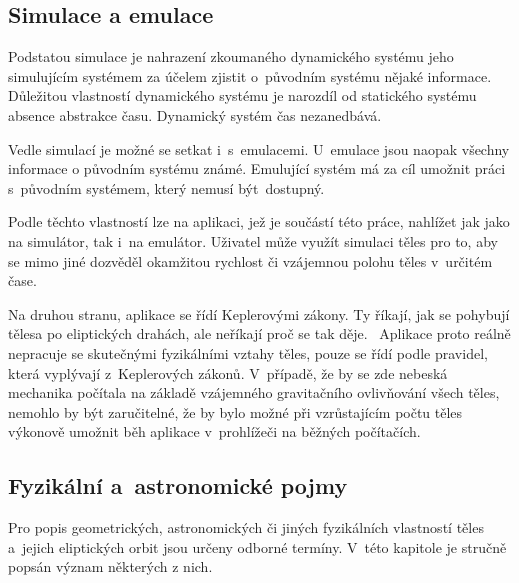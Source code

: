 \documentclass[a4paper,12pt]{article}
\begin{document}
\subsection{Simulace a emulace}

Podstatou simulace je nahrazení zkoumaného dynamického systému jeho simulujícím systémem za účelem zjistit o~původním systému nějaké informace. Důležitou vlastností dynamického systému je narozdíl od statického systému absence abstrakce času. Dynamický systém čas nezanedbává.~\cite{simulations} 

Vedle simulací je možné se setkat i~s~emulacemi. U~emulace jsou naopak všechny informace o původním systému známé. Emulující systém má za cíl umožnit práci s~původním systémem, který nemusí být~dostupný.~\cite{emulations}

Podle těchto vlastností lze na aplikaci, jež je součástí této práce, nahlížet jak jako na simulátor, tak i~na emulátor. Uživatel může využít simulaci těles pro to, aby se mimo jiné dozvěděl okamžitou rychlost či vzájemnou polohu těles v~určitém čase.

Na druhou stranu, aplikace se řídí Keplerovými zákony. Ty říkají, jak se pohybují tělesa po eliptických drahách, ale neříkají proč se tak děje.~\cite{kleczek} Aplikace proto reálně nepracuje se skutečnými fyzikálními vztahy těles, pouze se řídí podle pravidel, která vyplývají z~Keplerových zákonů. V~případě, že by se zde nebeská mechanika počítala na základě vzájemného gravitačního ovlivňování všech těles, nemohlo by být zaručitelné, že by bylo možné při vzrůstajícím počtu těles výkonově umožnit běh aplikace v~prohlížeči na běžných počítačích.

\subsection{Fyzikální a~astronomické pojmy}

Pro popis geometrických, astronomických či jiných fyzikálních vlastností těles a~jejich eliptických orbit jsou určeny odborné termíny. V~této kapitole je stručně popsán význam některých z nich.~\cite{kleczek}
\end{document}
